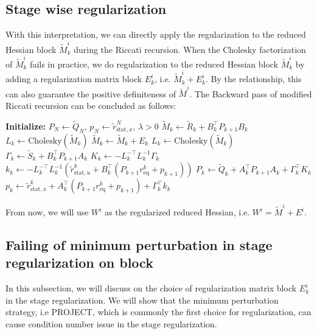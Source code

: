 \documentclass[conference]{IEEEtran}
\theoremstyle{plain}
\begin{document}
\subsection{Stage wise regularization}
With this interpretation, we can directly apply the regularization to the reduced Hessian block $\tilde{M}_k^i$ during the Riccati recursion.
When the Cholesky factorization of $\tilde{M}_k^i$ fails in practice, 
we do regularization to the reduced Hessian block $\tilde{M}_k^i$ by adding a regularization matrix block $E_k^i$, i.e. $\tilde{M}_k^i + E_k^i$.
By the relationship, this can also guarantee the positive definiteness of $\tilde{M}^i$.
The Backward pass of modified Riccati recursion can be concluded as follows:
\begin{algorithm}[H]
\caption{Backward Pass of Modified Riccati Recursion}
\label{alg:modified_riccati_recursion}
\begin{algorithmic}[1]
\State\textbf{Initialize:} $P_N \gets \tilde{Q}_N$, $p_N \gets \tilde{r}_{\mathrm{stat}, x}^N$, $\lambda > 0$
\Statex 
{}
    \State $\tilde{M}_k \gets \tilde{R}_k + B_k^\top P_{k+1} B_k$
    \State $L_k \gets \mathrm{Cholesky}(\tilde{M}_k)$
        \State $\tilde{M}_k \gets \tilde{M}_k + E_k$ 
        \State $L_k \gets \mathrm{Cholesky}(\tilde{M}_k)$
    \EndIf
    \State $\Gamma_k \gets \tilde{S}_k + B_k^\top P_{k+1} A_k$
    \Statex
    \State $K_k \gets -L_k^{-\top} L_k^{-1} \Gamma_k$
    \State $k_k \gets -L_k^{-\top} L_k^{-1} \left(\tilde{r}_{\mathrm{stat}, u}^k + B_k^\top (P_{k+1} r_{\mathrm{eq}}^k + p_{k+1})\right)$
    \Statex
    \State $P_k \gets \tilde{Q}_k + A_k^\top P_{k+1} A_k + \Gamma_k^\top K_k$
    \State $p_k \gets \tilde{r}_{\mathrm{stat}, x}^k + A_k^\top (P_{k+1} r_{\mathrm{eq}}^k + p_{k+1}) + \Gamma_k^\top k_k$
\EndFor
\end{algorithmic}
\end{algorithm}

From now, we will use $W^i$ as the regularized reduced Hessian, i.e. $W^i = \tilde{M}^i + E^i$.

\subsection{Failing of minimum perturbation in stage regularization on block}
In this subsection, we will discuss on the choice of regularization matrix block $E^i_k$ in the stage regularization.
We will show that the minimum perturbation strategy, i.e PROJECT\cite{verschuerenSparsityPreservingConvexification2017}, which is commonly the first choice for regularization,
can cause condition number issue in the stage regularization.
\end{document}
